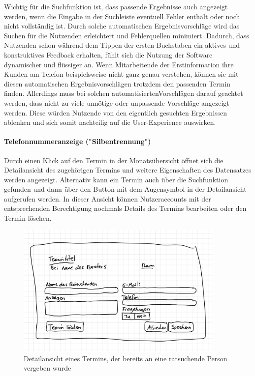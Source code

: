 \documentclass[12pt]{article}
\begin{document}
Wichtig für die Suchfunktion ist, dass passende Ergebnisse auch angezeigt
werden, wenn die Eingabe in der Suchleiste eventuell Fehler enthält oder noch
nicht vollständig ist. Durch solche automatischen Ergebnisvorschläge wird das
Suchen für die Nutzenden erleichtert und Fehlerquellen minimiert. Dadurch, dass
Nutzenden schon während dem Tippen der ersten Buchstaben ein aktives und
konstruktives Feedback erhalten, fühlt sich die Nutzung der Software
dynamischer und flüssiger an. \cite{autoCompletion} Wenn Mitarbeitende der
Erstinformation ihre Kunden am Telefon beispielsweise nicht ganz genau
verstehen, können sie mit diesen automatischen Ergebnisvorschlägen trotzdem den
passenden Termin finden. Allerdings muss bei solchen automatisiertenVorschlägen
darauf geachtet werden, dass nicht zu viele unnötige oder unpassende Vorschläge
angezeigt werden. Diese würden Nutzende von den eigentlich gesuchten
Ergebnissen ablenken und sich somit nachteilig auf die User-Experience
auswirken. \cite{autosuggModeration}

\paragraph{Telefonnummeranzeige ("Silbentrennung")}

Durch einen Klick auf den Termin in der Monatsübersicht öffnet sich die
Detailansicht des zugehörigen Termins und weitere Eigenschaften des Datensatzes
werden angezeigt. Alternativ kann ein Termin auch über die Suchfunktion
gefunden und dann über den Button mit dem Augensymbol in der Detailansicht
aufgerufen werden. In dieser Ansicht können Nutzeraccounts mit der
entsprechenden Berechtigung nochmals Details des Termins bearbeiten oder den
Termin löschen.

\begin{figure}[h]
    \caption{Detailansicht eines Termins, der bereits an eine ratsuchende Person vergeben wurde}
    \centering
    \includegraphics[width=0.9\textwidth]{doodle_client_details.jpeg}
\end{figure}
\end{document}
